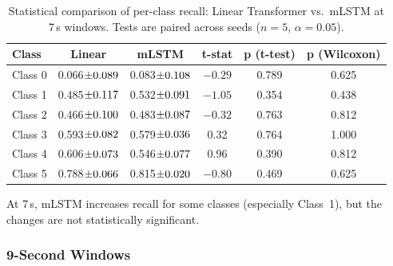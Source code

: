 \begin{table}[htbp]
\centering
\caption{Statistical comparison of per-class recall: Linear Transformer vs.\ \ac{mLSTM} at 7\,s windows. Tests are paired across seeds ($n=5$, $\alpha=0.05$).}
\label{tab:class_comparison_7s}
\small
\setlength{\tabcolsep}{3pt}
\begin{tabular}{l|c|c|c|c|c}
\hline
		\textbf{Class} & \textbf{Linear} & \textbf{\ac{mLSTM}} & \textbf{t-stat} & \textbf{p (t-test)} & \textbf{p (Wilcoxon)} \\
\hline
Class 0 & 0.066$\pm{\scriptsize 0.089}$ & 0.083$\pm{\scriptsize 0.108}$ & $-0.29$ & 0.789 & 0.625 \\
Class 1 & 0.485$\pm{\scriptsize 0.117}$ & 0.532$\pm{\scriptsize 0.091}$ & $-1.05$ & 0.354 & 0.438 \\
Class 2 & 0.466$\pm{\scriptsize 0.100}$ & 0.483$\pm{\scriptsize 0.087}$ & $-0.32$ & 0.763 & 0.812 \\
Class 3 & 0.593$\pm{\scriptsize 0.082}$ & 0.579$\pm{\scriptsize 0.036}$ & 0.32 & 0.764 & 1.000 \\
Class 4 & 0.606$\pm{\scriptsize 0.073}$ & 0.546$\pm{\scriptsize 0.077}$ & 0.96 & 0.390 & 0.812 \\
Class 5 & 0.788$\pm{\scriptsize 0.066}$ & 0.815$\pm{\scriptsize 0.020}$ & $-0.80$ & 0.469 & 0.625 \\
\hline
\end{tabular}
\setlength{\tabcolsep}{6pt}
\end{table}

At 7\,s, \ac{mLSTM} increases recall for some classes (especially Class~1), but the changes are not statistically significant.

\subsubsection{9-Second Windows}

